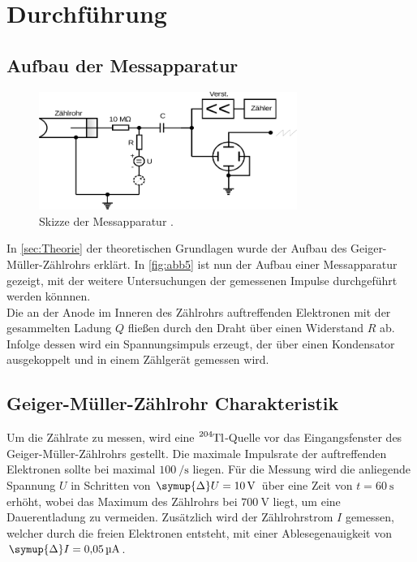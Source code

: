 \section{Durchführung} \label{sec:Durchführung}

\subsection{Aufbau der Messapparatur}

    \begin{figure}
      \centering
      \includegraphics[width=0.75\textwidth]{content/img/Abb_5.pdf}
      \caption{Skizze der Messapparatur \cite{versuchsanleitung}.}
      \label{fig:abb5}
    \end{figure}

    In \autoref{sec:Theorie} der theoretischen Grundlagen wurde der Aufbau des Geiger-Müller-Zählrohrs erklärt.
    In \autoref{fig:abb5} ist nun der Aufbau einer Messapparatur gezeigt,
    mit der weitere Untersuchungen der gemessenen Impulse durchgeführt werden könnnen. \\
    Die an der Anode im Inneren des Zählrohrs auftreffenden Elektronen mit der gesammelten
    Ladung $Q$ fließen durch den Draht über einen Widerstand $R$ ab.
    Infolge dessen wird ein Spannungsimpuls erzeugt,
    der über einen Kondensator ausgekoppelt und in einem Zählgerät gemessen wird.

\subsection{Geiger-Müller-Zählrohr Charakteristik} \label{sec:charaktbestimmen}

    Um die Zählrate zu messen, wird eine $\ce{^204Tl}$-Quelle vor das Eingangsfenster
    des Geiger-Müller-Zählrohrs gestellt. Die maximale Impulsrate der auftreffenden
    Elektronen sollte bei maximal $\SI{100}{\per\second}$ liegen.
    Für die Messung wird die anliegende Spannung $U$ in Schritten von $\symup{\Delta}U = \SI{10}{\volt}$
    über eine Zeit von $t = \SI{60}{\second}$ erhöht,
    wobei das Maximum des Zählrohrs bei $\SI{700}{\volt}$ liegt, um eine Dauerentladung
    zu vermeiden.
    Zusätzlich wird der Zählrohrstrom $I$ gemessen, welcher durch die freien Elektronen
    entsteht, mit einer Ablesegenauigkeit von $\symup{\Delta}I = \SI{0.05}{\micro\ampere}$.

